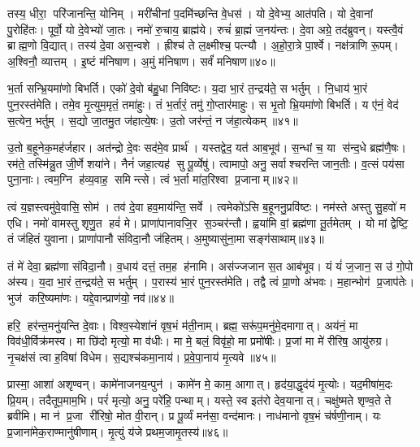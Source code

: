 तस्य॒ धीरा॒ परि॑जानन्ति॒ योनिम्। मरी॑चीनां प॒दमि॑च्छन्ति वे॒धस॑। यो दे॒वेभ्य॒ आत॑पति। यो दे॒वानां पु॒रोहि॑तः। पूर्वो॒ यो दे॒वेभ्यो॑ जा॒तः। नमो॑ रु॒चाय॒ ब्राह्म॑ये। रुचं॑ ब्रा॒ह्मं ज॒नय॑न्तः। दे॒वा अग्रे॒ तद॑ब्रुवन्। यस्त्वै॒वं ब्राह्म॒णो वि॒द्यात्। तस्य॑ दे॒वा अस॒न्वशे। ह्रीश्च॑ ते ल॒क्ष्मीश्च॒ पत्न्यौ। अ॒हो॒रा॒त्रे पा॒र्श्वे। नक्ष॑त्राणि रू॒पम्। अ॒श्विनौ॒ व्यात्तम्। इ॒ष्टं म॑निषाण। अ॒मुं म॑निषाण। सर्वं॑ मनिषाण॥४०॥
\anuvakamend[जा॒य॒ते॒ वशे॑ स॒प्त च॑]

भ॒र्ता सन्भ्रि॒यमा॑णो बिभर्ति। एको॑ दे॒वो ब॑हु॒धा निवि॑ष्टः। य॒दा भा॒रं त॒न्द्रय॑ते॒ स भर्तुम्। नि॒धाय॑ भा॒रं पुन॒रस्त॑मेति। तमे॒व मृ॒त्युम॒मृतं॒ तमा॑हुः। तं भ॒र्तारं॒ तमु॑ गो॒प्तार॑माहुः। स भृ॒तो भ्रि॒यमा॑णो बिभर्ति। य ए॑नं॒ वेद॑ स॒त्येन॒ भर्तुम्। स॒द्यो जा॒तमु॒त ज॑हात्ये॒षः। उ॒तो जर॑न्तं॒ न ज॑हा॒त्येकम्॥४१॥

उ॒तो ब॒हूनेक॒मह॑र्जहार। अत॑न्द्रो दे॒वः सद॑मे॒व प्रार्थ॑। यस्तद्वेद॒ यत॑ आब॒भूव॑। स॒न्धां च॒ या स॑न्द॒धे ब्रह्म॑णै॒षः। रम॑ते॒ तस्मि॑न्नु॒त जी॒र्णे शया॑ने। नैनं॑ जहा॒त्यह॑ सु पू॒र्व्येषु॑। त्वामापो॒ अनु॒ सर्वाश्चरन्ति जान॒तीः। व॒त्सं पय॑सा पुना॒नाः। त्वम॒ग्नि ह॑व्य॒वाह॒ समिन्त्से। त्वं भ॒र्ता मा॑त॒रिश्वा प्र॒जानाम्॥४२॥

त्वं य॒ज्ञस्त्वमु॑वे॒वासि॒ सोम॑। तव॑ दे॒वा हव॒माय॑न्ति॒ सर्वे। त्वमेको॑ऽसि ब॒हूननु॒प्रवि॑ष्टः। नम॑स्ते अस्तु सु॒हवो॑ म एधि। नमो॑ वामस्तु शृणु॒त हवं॑ मे। प्राणा॑पानावजि॒र स॒ञ्चर॑न्तौ। ह्वया॑मि वां॒ ब्रह्म॑णा तू॒र्तमेतम्। यो मां द्वेेष्टि॒ तं ज॑हितं युवाना। प्राणा॑पानौ संविदा॒नौ ज॑हितम्। अ॒मुष्यासु॑ना॒मा सङ्ग॑साथाम्॥४३॥

तं मे॑ देवा॒ ब्रह्म॑णा संविदा॒नौ। व॒धाय॑ दत्तं॒ तम॒ह ह॑नामि। अस॑ज्जजान स॒त आब॑भूव। यं यं॑ ज॒जान॒ स उ॑ गो॒पो अ॑स्य। य॒दा भा॒रं त॒न्द्रय॑ते॒ स भर्तुम्। प॒रास्य॑ भा॒रं पुन॒रस्त॑मेति। तद्वै त्वं प्रा॒णो अ॑भवः। म॒हान्भोग॑ प्र॒जाप॑तेः। भुज॑ करि॒ष्यमा॑णः। यद्दे॒वान्प्राण॑यो॒ नव॑॥४४॥
\anuvakamend[एकं॑ प्र॒जानाङ्गसाथां॒ नव॑]

हरि॒ हर॑न्त॒मनु॑यन्ति दे॒वाः। विश्व॒स्येशा॑नं वृष॒भं म॑ती॒नाम्। ब्रह्म॒ सरू॑प॒मनु॑मे॒दमागात्। अय॑नं॒ मा विव॑धी॒र्विक्र॑मस्व। मा छि॑दो मृत्यो॒ मा व॑धीः। मा मे॒ बलं॒  विवृ॑हो॒ मा प्रमो॑षीः। प्र॒जां मा मे॑ रीरिष॒ आयु॑रुग्र। नृ॒चक्ष॑सं त्वा ह॒विषा॑ विधेम। स॒द्यश्च॑कमा॒नाय॑। प्र॒वे॒पा॒नाय॑ मृ॒त्यवे॥४५॥

प्रास्मा॒ आशा॑ अशृण्वन्। कामे॑नाजनय॒न्पुन॑। कामे॑न मे॒ काम॒ आगात्। हृद॑या॒द्धृद॑यं मृ॒त्योः। यद॒मीषा॑म॒दः प्रि॒यम्। तदैतूप॒माम॒भि। परं॑ मृत्यो॒ अनु॒ परे॑हि॒ पन्थाम्। यस्ते॒ स्व इत॑रो देव॒यानात्। चक्षु॑ष्मते शृण्व॒ते ते ब्रवीमि। मा न॑ प्र॒जा री॑रिषो॒ मोत वी॒रान्। प्र पू॒र्व्यं मन॑सा॒ वन्द॑मानः। नाध॑मानो वृष॒भं च॑र्\mbox{}षणी॒नाम्। यः प्र॒जाना॑मेक॒राण्मानु॑षीणाम्। मृ॒त्युं य॑जे प्रथम॒जामृ॒तस्य॑॥४६॥
\anuvakamend[मृ॒त्यवे॑ वी॒राश्च॒त्वारि॑ च]

